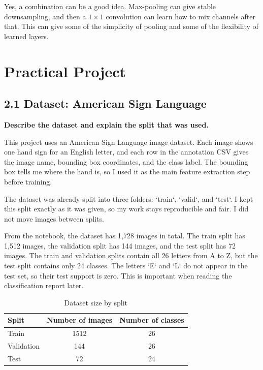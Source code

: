 \documentclass[12pt,a4paper]{article}
\newcommand{\qtext}[1]{\noindent\textbf{#1}\par}
\newcommand{\ansstart}{\begingroup\color{answerblue}}
\newcommand{\ansend}{\endgroup}
\begin{document}
Yes, a combination can be a good idea. Max-pooling can give stable downsampling, and then a \(1 \times 1\) convolution can learn how to mix channels after that. This can give some of the simplicity of pooling and some of the flexibility of learned layers.
\ansend

\clearpage

\section{Practical Project}

\subsection{2.1 Dataset: American Sign Language}

\qtext{Describe the dataset and explain the split that was used.}

\ansstart
This project uses an American Sign Language image dataset. Each image shows one hand sign for an English letter, and each row in the annotation CSV gives the image name, bounding box coordinates, and the class label. The bounding box tells me where the hand is, so I used it as the main feature extraction step before training.

The dataset was already split into three folders: `train`, `valid`, and `test`. I kept this split exactly as it was given, so my work stays reproducible and fair. I did not move images between splits.

From the notebook, the dataset has 1,728 images in total. The train split has 1,512 images, the validation split has 144 images, and the test split has 72 images. The train and validation splits contain all 26 letters from A to Z, but the test split contains only 24 classes. The letters `E` and `L` do not appear in the test set, so their test support is zero. This is important when reading the classification report later.
\ansend

\begin{table}[H]
\centering
\caption{Dataset size by split}
\begin{tabular}{lcc}
\toprule
Split & Number of images & Number of classes \\
\midrule
Train & 1512 & 26 \\
Validation & 144 & 26 \\
Test & 72 & 24 \\
\bottomrule
\end{tabular}
\end{table}
\end{document}
